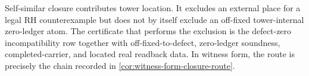 \begin{principle}
\label{prin:exact-boundary-self-similar-rh-route}
Self-similar closure contributes tower location.  It excludes an external
place for a legal RH counterexample but does not by itself exclude an
off-fixed tower-internal zero-ledger atom.  The certificate that performs the
exclusion is the defect-zero incompatibility row together with
off-fixed-to-defect, zero-ledger soundness, completed-carrier, and located
real readback data.  In witness form, the route is precisely the chain
recorded in \autoref{cor:witness-form-closure-route}.
\end{principle}

